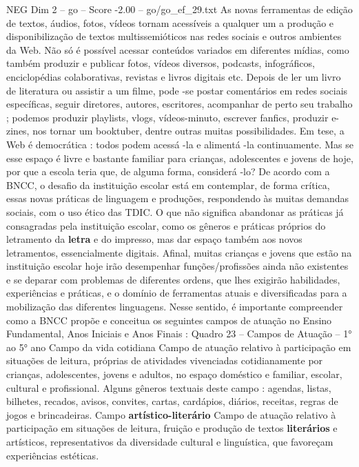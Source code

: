\begin{textsample}{NEG Dim 2 – go – Score -2.00 – go/go\_ef\_29.txt}
As novas ferramentas de edição de textos, áudios, fotos, vídeos tornam acessíveis a qualquer um a produção e disponibilização de textos multissemióticos nas redes sociais e outros ambientes da Web.
Não só é possível acessar conteúdos variados em diferentes mídias, como também produzir e publicar fotos, vídeos diversos, podcasts, infográficos, enciclopédias colaborativas, revistas e livros digitais etc.
Depois de ler um livro de literatura ou assistir a um filme, pode -se postar comentários em redes sociais específicas, seguir diretores, autores, escritores, acompanhar de perto seu trabalho ; podemos produzir playlists, vlogs, vídeos-minuto, escrever fanfics, produzir e-zines, nos tornar um booktuber, dentre outras muitas possibilidades.
Em tese, a Web é democrática : todos podem acessá -la e alimentá -la continuamente.
Mas se esse espaço é livre e bastante familiar para crianças, adolescentes e jovens de hoje, por que a escola teria que, de alguma forma, considerá -lo?
De acordo com a BNCC, o desafio da instituição escolar está em contemplar, de forma crítica, essas novas práticas de linguagem e produções, respondendo às muitas demandas sociais, com o uso ético das TDIC.
O que não significa abandonar as práticas já consagradas pela instituição escolar, como os gêneros e práticas próprios do letramento da \textbf{letra} e do impresso, mas dar espaço também aos novos letramentos, essencialmente digitais.
Afinal, muitas crianças e jovens que estão na instituição escolar hoje irão desempenhar funções/profissões ainda não existentes e se deparar com problemas de diferentes ordens, que lhes exigirão habilidades, experiências e práticas, e o domínio de ferramentas atuais e diversificadas para a mobilização das diferentes linguagens.
Nesse sentido, é importante compreender como a BNCC propõe e conceitua os seguintes campos de atuação no Ensino Fundamental, Anos Iniciais e Anos Finais : Quadro 23 – Campos de Atuação – 1{\EmojiFont °} ao 5{\EmojiFont °} ano Campo da vida cotidiana Campo de atuação relativo à participação em situações de leitura, próprias de atividades vivenciadas cotidianamente por crianças, adolescentes, jovens e adultos, no espaço doméstico e familiar, escolar, cultural e profissional.
Alguns gêneros textuais deste campo : agendas, listas, bilhetes, recados, avisos, convites, cartas, cardápios, diários, receitas, regras de jogos e brincadeiras.
Campo \textbf{artístico-literário} Campo de atuação relativo à participação em situações de leitura, fruição e produção de textos \textbf{literários} e artísticos, representativos da diversidade cultural e linguística, que favoreçam experiências estéticas.

\end{textsample}
